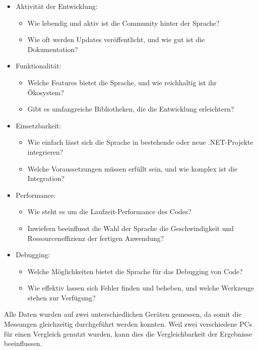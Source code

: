 \begin{itemize}
    \item Aktivität der Entwicklung: 
    \begin{itemize}
        \item Wie lebendig und aktiv ist die Community hinter der Sprache? 
        \item Wie oft werden Updates veröffentlicht, und wie gut ist die Dokumentation?
    \end{itemize}
    \item Funktionalität:
    \begin{itemize}
        \item Welche Features bietet die Sprache, und wie reichhaltig ist ihr Ökosystem? 
        \item Gibt es umfangreiche Bibliotheken, die die Entwicklung erleichtern?
    \end{itemize}
    \item Einsetzbarkeit:
    \begin{itemize}
        \item Wie einfach lässt sich die Sprache in bestehende oder neue .NET-Projekte integrieren?
        \item Welche Voraussetzungen müssen erfüllt sein, und wie komplex ist die Integration?
    \end{itemize}
    \item Performance:
    \begin{itemize}
        \item Wie steht es um die Laufzeit-Performance des Codes? 
        \item Inwiefern beeinflusst die Wahl der Sprache die Geschwindigkeit und Ressourceneffizienz der fertigen Anwendung?
    \end{itemize}
    \item Debugging:
    \begin{itemize}
        \item Welche Möglichkeiten bietet die Sprache für das Debugging von Code?
        \item Wie effektiv lassen sich Fehler finden und beheben, und welche Werkzeuge stehen zur Verfügung?
    \end{itemize}
\end{itemize}

\newpage
Alle Daten wurden auf zwei unterschiedlichen Geräten gemessen, da somit die Messungen gleichzeitig durchgeführt werden konnten.
Weil zwei verschiedene PCs für einen Vergleich genutzt wurden, kann dies die Vergleichbarkeit der Ergebnisse beeinflussen.

